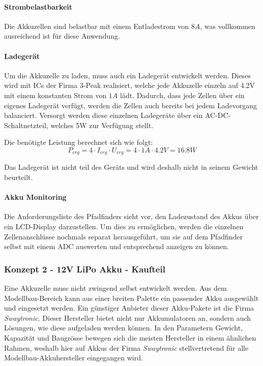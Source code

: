 \documentclass[main.tex]{subfiles} %
\begin{document}
\paragraph{Strombelastbarkeit}
Die Akkuzellen sind belastbar mit einem Entladestrom von $8A$, was vollkommen
ausreichend ist für diese Anwendung.

\paragraph{Ladegerät}
Um die Akkuzelle zu laden, muss auch ein Ladegerät entwickelt werden. Dieses
wird mit ICs der Firma 3-Peak realisiert, welche jede Akkuzelle einzeln auf
4.2V mit einem konstanten Strom von $1A$ lädt. Dadurch, dass jede Zellen über
ein eigenes Ladegerät verfügt, werden die Zellen auch bereits bei jedem
Ladevorgang balanciert. Versorgt werden diese einzelnen Ladegeräte über ein
AC-DC-Schaltnetzteil, welches 5W zur Verfügung stellt.

Die benötigte Leistung berechnet sich wie folgt:
\[
    P_{crg} = 4 \cdot I_{crg} \cdot U_{crg} =  4 \cdot 1A \cdot 4.2V = 16.8W
\]

Das Ladegerät ist nicht teil des Geräts und wird deshalb nicht in seinem
Gewicht beurteilt.

\paragraph{Akku Monitoring}
Die Anforderungsliste des Pfadfinders sieht vor, den Ladezustand des Akkus über
ein LCD-Display darzustellen. Um dies zu ermöglichen, werden die einzelnen
Zellenanschlüsse nochmals separat herausgeführt, um sie auf dem Pfadfinder
selbst mit einem ADC auswerten und entsprechend anzeigen zu können.

\newpage
\subsubsection{Konzept 2 - 12V LiPo Akku - Kaufteil}

Eine Akkuzelle muss nicht zwingend selbst entwickelt werden. Aus dem
Modellbau-Bereich kann aus einer breiten Palette ein passender Akku ausgewählt
und eingesetzt werden. Ein günstiger Anbieter dieser Akku-Pakete ist die Firma
\textit{Swaytronic}. Dieser Hersteller bietet nicht nur Akkumulatoren an,
sondern auch Lösungen, wie diese aufgeladen werden können. In den Parametern
Gewicht, Kapazität und Baugrösse bewegen sich die meisten Hersteller in einem
ähnlichen Rahmen, weshalb hier auf Akkus der Firma \textit{Swaytronic}
stellvertretend für alle Modellbau-Akkuhersteller eingegangen wird.
\end{document}
